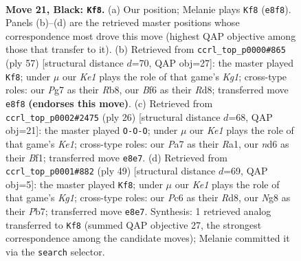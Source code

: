 \documentclass[11pt]{article}
\begin{document}
\clearpage

\begin{figure}[p]\centering
\begin{subfigure}{0.46\textwidth}\centering
\resizebox{\linewidth}{!}{%
\newchessgame
\chessboard[
  setfen={r1b1k1nr/p5pp/2pN1b2/5p2/5B2/3B1P1P/PPP3P1/R2R2K1 b - - 4 21},
  showmover=false,
  pgfstyle=straightmove, color=movearrow, markmove={e8-f8}
]}
\caption{}
\end{subfigure}\hfill
\begin{subfigure}{0.46\textwidth}\centering
\resizebox{\linewidth}{!}{%
\newchessgame
\chessboard[
  setfen={1r1rb1k1/5p2/2p1p2p/p1N3p1/1nBP4/5P2/PP4PP/2RR2K1 b - - 5 29},
  showmover=false,
  pgfstyle=straightmove, color=movearrow, markmove={g8-f8}
]}
\caption{}
\end{subfigure}
\\[4pt]
\begin{subfigure}{0.46\textwidth}\centering
\resizebox{\linewidth}{!}{%
\newchessgame
\chessboard[
  setfen={r3kb1r/1p3ppp/p1n5/3b4/5B2/1N6/PPP3PP/R3KB1R w KQkq - 0 14},
  showmover=false,
  pgfstyle=straightmove, color=movearrow, markmove={e1-c1}
]}
\caption{}
\end{subfigure}\hfill
\begin{subfigure}{0.46\textwidth}\centering
\resizebox{\linewidth}{!}{%
\newchessgame
\chessboard[
  setfen={r1br2k1/1p2bpp1/2pN3p/p3P3/5P2/P4P2/1P1R3P/3R1BK1 b - - 2 25},
  showmover=false,
  pgfstyle=straightmove, color=movearrow, markmove={g8-f8}
]}
\caption{}
\end{subfigure}
\caption{\textbf{Move 21, Black: \texttt{Kf8}.} (a) Our position; Melanie plays \texttt{Kf8} (\texttt{e8f8}). Panels (b)--(d) are the retrieved master positions whose correspondence most drove this move (highest QAP objective among those that transfer to it). (b) Retrieved from \texttt{ccrl\_top\_p0000\#865} (ply 57) [structural distance $d$=70, QAP obj=27]: the master played \texttt{Kf8}; under $\mu$ our \emph{Ke1} plays the role of that game's \emph{Kg1}; cross-type roles: our \emph{P}g7 as their \emph{R}b8, our \emph{B}f6 as their \emph{R}d8; transferred move \texttt{e8f8} \textbf{(endorses this move)}. (c) Retrieved from \texttt{ccrl\_top\_p0002\#2475} (ply 26) [structural distance $d$=68, QAP obj=21]: the master played \texttt{O-O-O}; under $\mu$ our \emph{Ke1} plays the role of that game's \emph{Ke1}; cross-type roles: our \emph{P}a7 as their \emph{R}a1, our \emph{n}d6 as their \emph{B}f1; transferred move \texttt{e8e7}. (d) Retrieved from \texttt{ccrl\_top\_p0001\#882} (ply 49) [structural distance $d$=69, QAP obj=5]: the master played \texttt{Kf8}; under $\mu$ our \emph{Ke1} plays the role of that game's \emph{Kg1}; cross-type roles: our \emph{P}c6 as their \emph{R}d8, our \emph{N}g8 as their \emph{P}b7; transferred move \texttt{e8e7}. Synthesis: 1 retrieved analog transferred to \texttt{Kf8} (summed QAP objective 27, the strongest correspondence among the candidate moves); Melanie committed it via the \texttt{search} selector.}
\label{fig:thought-m41}
\end{figure}
\end{document}
